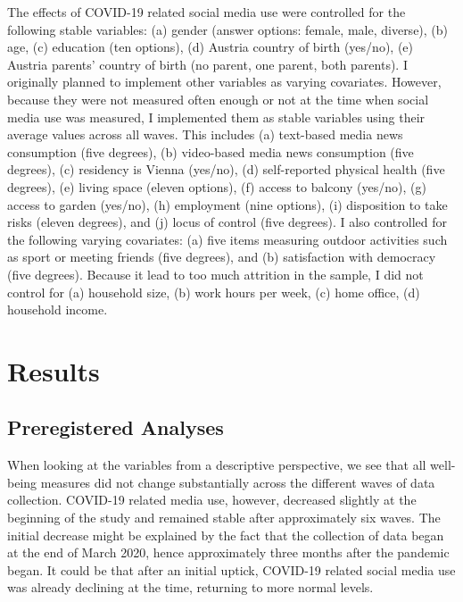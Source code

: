 \documentclass[
  english,
  man,mask,floatsintext]{apa6}
\begin{document}
The effects of COVID-19 related social media use were controlled for the following stable variables:
(a) gender (answer options: female, male, diverse), (b) age, (c) education (ten options), (d) Austria country of birth (yes/no), (e) Austria parents' country of birth (no parent, one parent, both parents).
I originally planned to implement other variables as varying covariates.
However, because they were not measured often enough or not at the time when social media use was measured, I implemented them as stable variables using their average values across all waves.
This includes (a) text-based media news consumption (five degrees), (b) video-based media news consumption (five degrees), (c) residency is Vienna (yes/no), (d) self-reported physical health (five degrees), (e) living space (eleven options), (f) access to balcony (yes/no), (g) access to garden (yes/no), (h) employment (nine options), (i) disposition to take risks (eleven degrees), and (j) locus of control (five degrees).
I also controlled for the following varying covariates: (a) five items measuring outdoor activities such as sport or meeting friends (five degrees), and (b) satisfaction with democracy (five degrees).
Because it lead to too much attrition in the sample, I did not control for (a) household size, (b) work hours per week, (c) home office, (d) household income.

\hypertarget{results}{%
\section{Results}\label{results}}

\hypertarget{preregistered-analyses}{%
\subsection{Preregistered Analyses}\label{preregistered-analyses}}

When looking at the variables from a descriptive perspective, we see that all well-being measures did not change substantially across the different waves of data collection.
COVID-19 related media use, however, decreased slightly at the beginning of the study and remained stable after approximately six waves.
The initial decrease might be explained by the fact that the collection of data began at the end of March 2020, hence approximately three months after the pandemic began.
It could be that after an initial uptick, COVID-19 related social media use was already declining at the time, returning to more normal levels.
\end{document}
